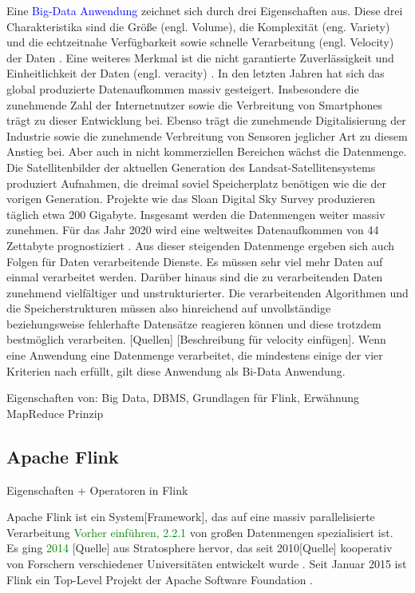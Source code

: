 Eine \textcolor{blue}{Big-Data Anwendung} zeichnet sich durch drei Eigenschaften aus. Diese drei Charakteristika sind die Größe (engl. Volume), die Komplexität (eng. Variety) und die echtzeitnahe Verfügbarkeit sowie schnelle Verarbeitung (engl. Velocity) der Daten \cite{Laney2001}. Eine weiteres Merkmal ist die nicht garantierte Zuverlässigkeit und Einheitlichkeit der Daten (engl. veracity) \cite{Zikopoulos2012}. 
In den letzten Jahren hat sich das global produzierte Datenaufkommen massiv gesteigert. Insbesondere die zunehmende Zahl der Internetnutzer sowie die Verbreitung von Smartphones trägt zu dieser Entwicklung bei. Ebenso trägt die zunehmende Digitalisierung der Industrie sowie die zunehmende Verbreitung von Sensoren jeglicher Art zu diesem Anstieg bei. Aber auch in nicht kommerziellen Bereichen wächst die Datenmenge. Die Satellitenbilder der aktuellen Generation des Landsat-Satellitensystems produziert Aufnahmen, die dreimal soviel Speicherplatz benötigen wie die der vorigen Generation. Projekte wie das Sloan Digital Sky Survey produzieren täglich etwa 200 Gigabyte. Insgesamt werden die Datenmengen weiter massiv zunehmen. Für das Jahr 2020 wird eine weltweites Datenaufkommen von 44 Zettabyte prognostiziert \cite{EMC2014}. Aus dieser steigenden Datenmenge ergeben sich auch Folgen für Daten verarbeitende Dienste. Es müssen sehr viel mehr Daten auf einmal verarbeitet werden. Darüber hinaus sind die zu verarbeitenden Daten zunehmend vielfältiger und unstrukturierter. Die verarbeitenden Algorithmen und die Speicherstrukturen müssen also hinreichend auf unvollständige beziehungsweise fehlerhafte Datensätze reagieren können und diese trotzdem bestmöglich verarbeiten. [Quellen] [Beschreibung für velocity einfügen].
Wenn eine Anwendung eine Datenmenge verarbeitet, die mindestens einige der vier Kriterien nach \cite{Laney2001} erfüllt, gilt diese Anwendung als Bi-Data Anwendung. 


Eigenschaften von: Big Data, DBMS, Grundlagen für Flink, Erwähnung MapReduce Prinzip
\subsection{Apache Flink}
Eigenschaften + Operatoren in Flink

Apache Flink ist ein System[Framework], das auf eine massiv parallelisierte Verarbeitung \textcolor{green}{Vorher einführen, 2.2.1} von großen Datenmengen spezialisiert ist. Es ging \textcolor{green}{2014} [Quelle] aus Stratosphere hervor, das seit 2010[Quelle] kooperativ von Forschern verschiedener Universitäten entwickelt wurde \cite{Alexandrov2014}. Seit Januar 2015 ist Flink ein Top-Level Projekt der Apache Software Foundation \cite{ApacheFlinkBlogEntry}. 

